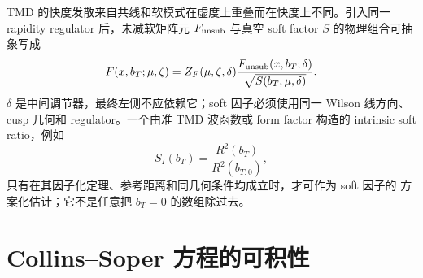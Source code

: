 \documentclass[UTF8,11pt,oneside]{ctexbook}
\begin{document}
TMD 的快度发散来自共线和软模式在虚度上重叠而在快度上不同。引入同一
rapidity regulator 后，未减软矩阵元 \(F_{\rm unsub}\) 与真空 soft factor
\(S\) 的物理组合可抽象写成
\begin{equation}
 F(x,b_T;\mu,\zeta)
 =Z_F(\mu,\zeta,\delta)
 \frac{F_{\rm unsub}(x,b_T;\delta)}
 {\sqrt{S(b_T;\mu,\delta)}} .
 \label{eq:deep-tmd-soft-subtraction}
\end{equation}
\(\delta\) 是中间调节器，最终左侧不应依赖它；soft 因子必须使用同一 Wilson
线方向、cusp 几何和 regulator。一个由准 TMD 波函数或 form factor 构造的
intrinsic soft ratio，例如
\begin{equation}
 S_I(b_T)=\frac{R^2(b_T)}{R^2(b_{T,0})},
 \label{eq:deep-intrinsic-soft-ratio}
\end{equation}
只有在其因子化定理、参考距离和同几何条件均成立时，才可作为 soft 因子的
方案化估计；它不是任意把 \(b_T=0\) 的数组除过去。

\section{Collins--Soper 方程的可积性}
\end{document}
